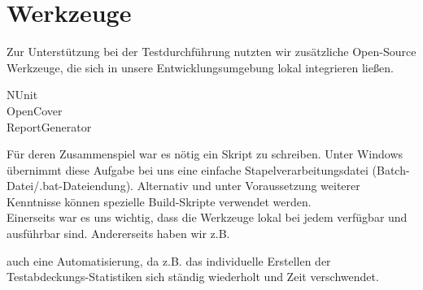 %



\section{Werkzeuge}
\label{Abschnitt:Tests:Werkzeuge}

Zur Unterstützung bei der Testdurchführung nutzten wir zusätzliche Open-Source Werkzeuge, die sich in unsere Entwicklungsumgebung lokal integrieren ließen.\\


\begin{description}

	\item[NUnit]
	
	\item[OpenCover]
	
	\item[ReportGenerator]

\end{description}

Für deren Zusammenspiel war es nötig ein Skript zu schreiben. Unter Windows übernimmt diese Aufgabe bei uns eine einfache Stapelverarbeitungsdatei (Batch-Datei/.bat-Dateiendung).
Alternativ und unter Voraussetzung weiterer Kenntnisse können spezielle Build-Skripte verwendet werden.\\
Einerseits war es uns wichtig, dass die Werkzeuge lokal bei jedem verfügbar und ausführbar sind. Andererseits haben wir z.B.


auch eine Automatisierung, da z.B. das individuelle Erstellen der Testabdeckungs-Statistiken sich ständig wiederholt und Zeit verschwendet. 






